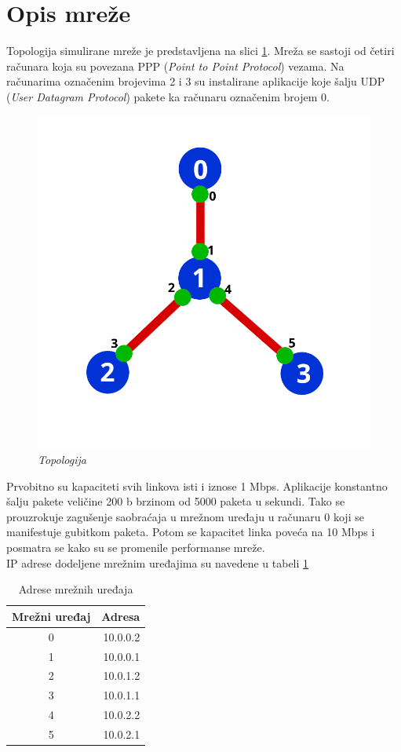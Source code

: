 \documentclass[a4paper, 12pt, projekat]{etf}
\begin{document}
	\section{Opis mreže}
	Topologija simulirane mreže je predstavljena na slici \ref{fig:topologija}. Mreža se sastoji od četiri računara koja su povezana PPP (\emph{Point to Point Protocol}) vezama. Na računarima označenim brojevima 2 i 3 su instalirane aplikacije koje šalju UDP (\emph{User Datagram Protocol}) pakete ka računaru označenim brojem 0. 
	\begin{figure}[htb]
		\centering
		\includegraphics[width=.6\textwidth]{../slike/topologija.png}
		\caption{\emph{Topologija}}
		\label{fig:topologija}
	\end{figure}
	
	Prvobitno su kapaciteti svih linkova isti i iznose 1\! Mbps.  Aplikacije konstantno šalju pakete veličine 200\! b brzinom od 5000 paketa u sekundi. Tako se prouzrokuje zagušenje saobraćaja u mrežnom uređaju u računaru 0 koji se manifestuje gubitkom paketa. Potom se kapacitet linka poveća na 10\! Mbps i posmatra se kako su se promenile performanse mreže.\\
	IP adrese dodeljene mrežnim uređajima su navedene u tabeli \ref{tab:adr}
	\begin{table}[htb]
		\centering
		\caption{Adrese mrežnih uređaja}
		\label{tab:adr}
		\medskip
		\begin{tabular}{c|r}
			\hline
			Mrežni uređaj & Adresa \\
			\hline
			0 & 10.0.0.2 \\
			1 & 10.0.0.1 \\
			2 & 10.0.1.2 \\
			3 & 10.0.1.1 \\
			4 & 10.0.2.2 \\
			5 & 10.0.2.1
		\end{tabular}
	\end{table}
	
\end{document}

